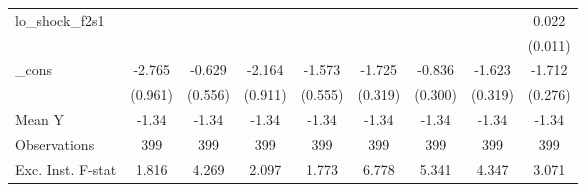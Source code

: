 {\begin{tabular}{l*{8}{c}}
\addlinespace
lo\_shock\_f2s1&                     &                     &                     &                     &                     &                     &                     &       0.022\sym{*}  \\
            &                     &                     &                     &                     &                     &                     &                     &     (0.011)         \\
\addlinespace
\_cons      &      -2.765\sym{***}&      -0.629         &      -2.164\sym{**} &      -1.573\sym{***}&      -1.725\sym{***}&      -0.836\sym{**} &      -1.623\sym{***}&      -1.712\sym{***}\\
            &     (0.961)         &     (0.556)         &     (0.911)         &     (0.555)         &     (0.319)         &     (0.300)         &     (0.319)         &     (0.276)         \\
\midrule
Mean Y      &       -1.34         &       -1.34         &       -1.34         &       -1.34         &       -1.34         &       -1.34         &       -1.34         &       -1.34         \\
Observations&         399         &         399         &         399         &         399         &         399         &         399         &         399         &         399         \\
Exc. Inst. F-stat&       1.816         &       4.269         &       2.097         &       1.773         &       6.778         &       5.341         &       4.347         &       3.071         \\
\bottomrule
\end{tabular}
}
